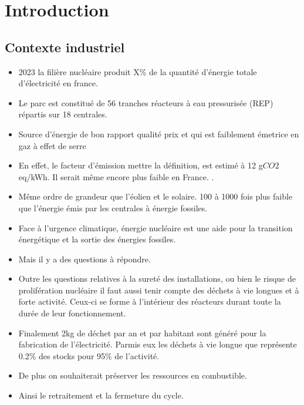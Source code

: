 
\chapter{Introduction}

\section{Contexte industriel}

\begin{itemize}
    \item 2023 la filière nucléaire produit X\% de la quantité d'énergie totale d'électricité en france.
    \item Le parc est constitué de 56 tranches réacteurs à eau pressurisée (REP) répartis sur 18 centrales.
    \item Source d'énergie de bon rapport qualité prix et qui est faiblement émetrice en gaz à effet de serre
    \item En effet, le facteur d'émission {mettre la définition}, est estimé à 12 g$CO2$eq/kWh. Il serait même encore plus faible en France. \cite{schlomer_technology-specific_nodate}.
    \item Même ordre de grandeur que l'éolien et le solaire. 100 à 1000 fois plus faible que l'énergie émis par les centrales à énergie fossiles.
    \item Face à l'urgence climatique, énergie nucléaire est une aide pour la transition énergétique et la sortie des énergies fossiles.
    \item Mais il y a des questions à répondre.
    \item Outre les questions relatives à la sureté des installations, ou bien le risque de prolifération nucléaire il faut aussi tenir compte des déchets à vie longues et à forte activité. Ceux-ci se forme à l'intérieur des réacteurs durant toute la durée de leur fonctionnement.
    \item Finalement 2kg de déchet par an et par habitant sont généré pour la fabrication de l'électricité. Parmis eux les déchets à vie longue que représente 0.2\% des stocks pour 95\% de l'activité.
    \item De plus on souhaiterait préserver les ressources en combustible.
    \item Ainsi le retraitement et la fermeture du cycle.
\end{itemize}

